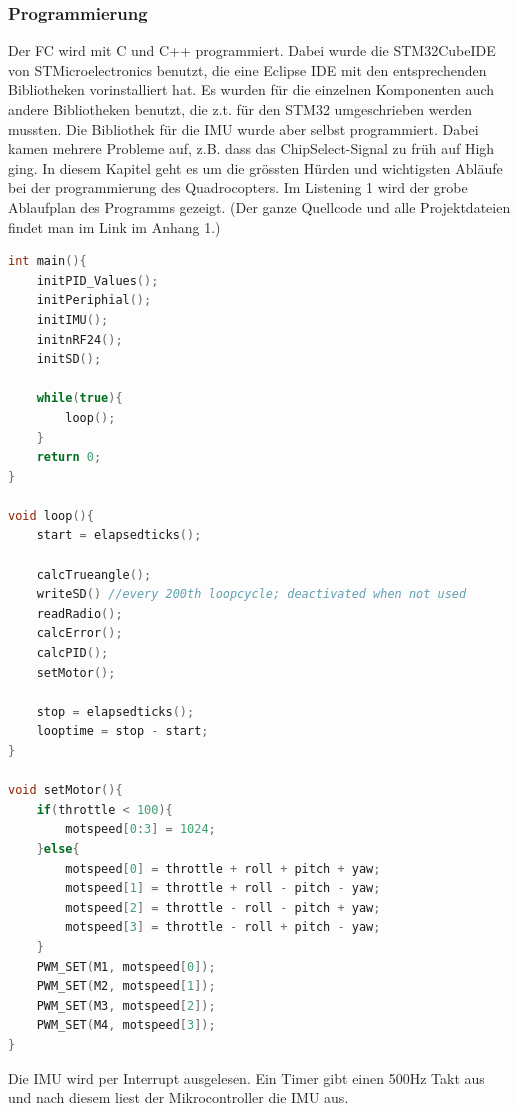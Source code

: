 \documentclass[12pt,a4paper, ngerman]{article}
\begin{document}
\subsubsection{Programmierung}
Der FC wird mit C und C++ programmiert. Dabei wurde die STM32CubeIDE von STMicroelectronics benutzt, die eine Eclipse IDE mit den entsprechenden Bibliotheken vorinstalliert hat. Es wurden für die einzelnen Komponenten auch andere Bibliotheken benutzt, die z.t. für den STM32 umgeschrieben werden mussten. Die Bibliothek für die IMU wurde aber selbst programmiert. Dabei kamen mehrere Probleme auf, z.B. dass das ChipSelect-Signal zu früh auf High ging. In diesem Kapitel geht es um die grössten Hürden und wichtigsten Abläufe bei der programmierung des Quadrocopters. Im Listening 1 wird der grobe Ablaufplan des Programms gezeigt. (Der ganze Quellcode und alle Projektdateien findet man im Link im Anhang 1.)

\begin{lstlisting}[language=C++,caption=Programmablauf Pseudocode]
int main(){
	initPID_Values();
	initPeriphial();
	initIMU();
	initnRF24();
	initSD();
	
	while(true){
		loop();
	}
	return 0;
}

void loop(){
	start = elapsedticks();
	
	calcTrueangle();
	writeSD() //every 200th loopcycle; deactivated when not used
	readRadio();
	calcError();
	calcPID();
	setMotor();
	
	stop = elapsedticks();
	looptime = stop - start;
}

void setMotor(){
	if(throttle < 100){
		motspeed[0:3] = 1024;	
	}else{
		motspeed[0] = throttle + roll + pitch + yaw; 
		motspeed[1]	= throttle + roll - pitch - yaw;
		motspeed[2]	= throttle - roll - pitch + yaw;
		motspeed[3]	= throttle - roll + pitch - yaw;
	}
	PWM_SET(M1, motspeed[0]);
	PWM_SET(M2, motspeed[1]);
	PWM_SET(M3, motspeed[2]);
	PWM_SET(M4, motspeed[3]);
}
\end{lstlisting}
\noindent
Die IMU wird per Interrupt ausgelesen. Ein Timer gibt einen 500Hz Takt aus und nach diesem liest der Mikrocontroller die IMU aus.
\newpage
\end{document}

